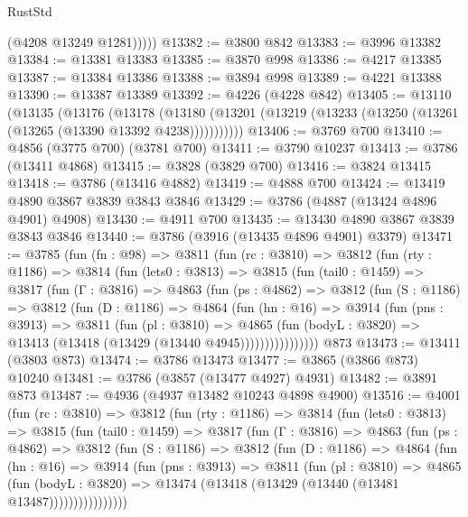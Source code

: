 \begin{lexlean}{RustStd}
\begin{coremodule}
            (@4208 @13249 @1281)))))
@13382 := @3800 @842
@13383 := @3996 @13382
@13384 := @13381 @13383
@13385 := @3870 @998
@13386 := @4217 @13385
@13387 := @13384 @13386
@13388 := @3894 @998
@13389 := @4221 @13388
@13390 := @13387 @13389
@13392 := @4226 (@4228 @842)
@13405 := @13110
    (@13135
      (@13176
        (@13178
          (@13180 (@13201 (@13219 (@13233 (@13250 (@13261 (@13265 (@13390 @13392 @4238)))))))))))
@13406 := @3769 @700
@13410 := @4856 (@3775 @700) (@3781 @700)
@13411 := @3790 @10237
@13413 := @3786 (@13411 @4868)
@13415 := @3828 (@3829 @700)
@13416 := @3824 @13415
@13418 := @3786 (@13416 @4882)
@13419 := @4888 @700
@13424 := @13419 @4890 @3867 @3839 @3843 @3846
@13429 := @3786 (@4887 (@13424 @4896 @4901) @4908)
@13430 := @4911 @700
@13435 := @13430 @4890 @3867 @3839 @3843 @3846
@13440 := @3786 (@3916 (@13435 @4896 @4901) @3379)
@13471 := @3785
    (fun (fn : @98) =>
    @3811
      (fun (rc : @3810) =>
      @3812
        (fun (rty : @1186) =>
        @3814
          (fun (lets0 : @3813) =>
          @3815
            (fun (tail0 : @1459) =>
            @3817
              (fun (Γ : @3816) =>
              @4863
                (fun (ps : @4862) =>
                @3812
                  (fun (S : @1186) =>
                  @3812
                    (fun (D : @1186) =>
                    @4864
                      (fun (hn : @16) =>
                      @3914
                        (fun (pns : @3913) =>
                        @3811
                          (fun (pl : @3810) =>
                          @4865
                            (fun (bodyL : @3820) =>
                            @13413 (@13418 (@13429 (@13440 @4945))))))))))))))))
    @873
@13473 := @13411 (@3803 @873)
@13474 := @3786 @13473
@13477 := @3865 (@3866 @873) @10240
@13481 := @3786 (@3857 (@13477 @4927) @4931)
@13482 := @3891 @873
@13487 := @4936 (@4937 @13482 @10243 @4898 @4900)
@13516 := @4001
    (fun (rc : @3810) =>
    @3812
      (fun (rty : @1186) =>
      @3814
        (fun (lets0 : @3813) =>
        @3815
          (fun (tail0 : @1459) =>
          @3817
            (fun (Γ : @3816) =>
            @4863
              (fun (ps : @4862) =>
              @3812
                (fun (S : @1186) =>
                @3812
                  (fun (D : @1186) =>
                  @4864
                    (fun (hn : @16) =>
                    @3914
                      (fun (pns : @3913) =>
                      @3811
                        (fun (pl : @3810) =>
                        @4865
                          (fun (bodyL : @3820) =>
                          @13474 (@13418 (@13429 (@13440 (@13481 @13487))))))))))))))))

\end{coremodule}
\end{lexlean}
